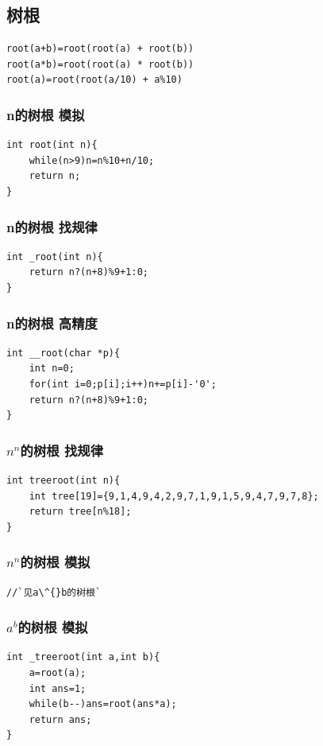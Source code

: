 \documentclass[a4paper]{article}
\begin{document}
\begin{CJK*}{UTF8}{gbsn}
\begin{multicols}{3}
\begin{flushleft}
\subsection{树根}
\begin{lstlisting}
root(a+b)=root(root(a) + root(b)) 
root(a*b)=root(root(a) * root(b)) 
root(a)=root(root(a/10) + a%10)
\end{lstlisting}

\subsubsection{n的树根 模拟}
\begin{lstlisting}
int root(int n){
	while(n>9)n=n%10+n/10;
	return n;
}
\end{lstlisting}

\subsubsection{n的树根 找规律}
\begin{lstlisting}
int _root(int n){
	return n?(n+8)%9+1:0;
}
\end{lstlisting}

\subsubsection{n的树根 高精度}
\begin{lstlisting}
int __root(char *p){
	int n=0;
	for(int i=0;p[i];i++)n+=p[i]-'0';
	return n?(n+8)%9+1:0;
} 
\end{lstlisting}

\subsubsection{$n^n$的树根 找规律}
\begin{lstlisting}
int treeroot(int n){
	int tree[19]={9,1,4,9,4,2,9,7,1,9,1,5,9,4,7,9,7,8};
	return tree[n%18];
} 
\end{lstlisting}

\subsubsection{$n^n$的树根 模拟}
\begin{lstlisting}
//`见a\^{}b的树根`
\end{lstlisting}

\subsubsection{$a^b$的树根 模拟}
\begin{lstlisting}
int _treeroot(int a,int b){
	a=root(a);
	int ans=1;
	while(b--)ans=root(ans*a);
	return ans;
}
\end{lstlisting}


\end{flushleft}
\end{multicols}
\end{CJK*}
\end{document}
